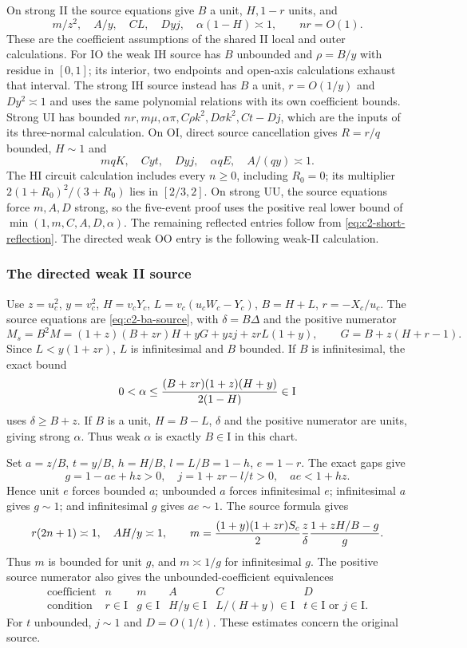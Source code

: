 On strong II the source equations give $B$ a unit, $H,1-r$ units, and
\[
 m/z^2,\quad A/y,\quad CL,\quad Dyj,\quad\alpha(1-H)\asymp1,
 \qquad nr=O(1).
\]
These are the coefficient assumptions of the shared II local and
outer calculations. For IO the weak IH source has $B$ unbounded and
$\rho=B/y$ with residue in $[0,1]$; its interior, two endpoints and
open-axis calculations exhaust that interval. The strong IH source
instead has $B$ a unit, $r=O(1/y)$ and $Dy^2\asymp1$ and uses the
same polynomial relations with its own coefficient bounds. Strong UI
has bounded $nr,m\mu,\alpha\pi,C\rho k^2,D\sigma k^2,Ct-Dj$,
which are the inputs of its three-normal calculation. On OI, direct
source cancellation gives $R=r/q$ bounded, $H\sim1$ and
\[
 mqK,\quad Cyt,\quad Dyj,\quad\alpha qE,\quad A/(qy)\asymp1.
\]
The HI circuit calculation includes every $n\ge0$, including $R_0=0$;
its multiplier $2(1+R_0)^2/(3+R_0)$ lies in $[2/3,2]$. On strong UU,
the source equations force $m,A,D$ strong, so the five-event proof
uses the positive real lower bound of $\min(1,m,C,A,D,\alpha)$.
The remaining reflected entries follow from
\eqref{eq:c2-short-reflection}. The directed weak OO entry is the
following weak-II calculation.

\subsubsection{The directed weak II source}
\label{component:pec6c617d3a3d}
\label{pec6c617d3a3d:sec:weak-c2-complete-join-rederived}
Use $z=u_c^2$, $y=v_c^2$, $H=v_cY_c$,
$L=v_c(u_cW_c-Y_c)$, $B=H+L$, $r=-X_c/u_c$.
The source equations are \eqref{eq:c2-ba-source}, with
$\delta=B\Delta$ and the positive numerator
\[
 M_s=B^2M=(1+z)(B+zr)H+yG+yzj+zrL(1+y),
 \qquad G=B+z(H+r-1).
\]
Since $L<y(1+zr)$, $L$ is
infinitesimal and $B$ bounded. If $B$ is infinitesimal, the exact bound
\[
 0<\alpha\le{(B+zr)(1+z)(H+y)\over2(1-H)}\in\mathrm I
\]
uses $\delta\ge B+z$. If $B$ is a unit, $H=B-L$, $\delta$ and the
positive numerator are units, giving strong $\alpha$. Thus weak
$\alpha$ is exactly $B\in\mathrm I$ in this chart.

Set $a=z/B$, $t=y/B$, $h=H/B$, $l=L/B=1-h$, $e=1-r$.
The exact gaps give
\[
 g=1-ae+hz>0,\quad j=1+zr-l/t>0,\quad ae<1+hz.
\]
Hence unit $e$ forces bounded $a$; unbounded $a$ forces infinitesimal
$e$; infinitesimal $a$ gives $g\sim1$; and infinitesimal $g$ gives
$ae\sim1$. The source formula gives
\[
 r(2n+1)\asymp1,\quad AH/y\asymp1,\qquad
 m={ (1+y)(1+zr)S_c\over2}{z\over\delta}
                       {1+zH/B-g\over g}.
\]
Thus $m$ is bounded for unit $g$, and $m\asymp1/g$ for
infinitesimal $g$. The positive source numerator also gives the
unbounded-coefficient equivalences
\[
\begin{array}{c|ccccc}
 \text{coefficient}&n&m&A&C&D\\\hline
 \text{condition}&r\in\mathrm I&g\in\mathrm I&H/y\in\mathrm I&
 L/(H+y)\in\mathrm I&t\in\mathrm I\text{ or }j\in\mathrm I.
\end{array}
\]
For $t$ unbounded, $j\sim1$ and $D=O(1/t)$.
These estimates concern the original source.

